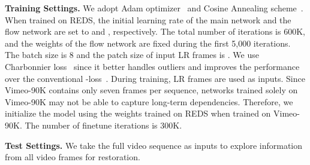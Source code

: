 \documentclass[10pt,twocolumn,letterpaper]{article}
\begin{document}
\noindent\textbf{Training Settings.}
We adopt Adam optimizer~\cite{kingma2014adam} and Cosine Annealing scheme~\cite{loshchilov2016sgdr}. When trained on REDS, the initial learning rate of the main network and the flow network are set to  and , respectively. The total number of iterations is 600K, and the weights of the flow network are fixed during the first 5,000 iterations. The batch size is 8 and the patch size of input LR frames is . We use Charbonnier loss~\cite{charbonnier1994two} since it better handles outliers and improves the performance over the conventional -loss~\cite{lai2017deep}. During training,  LR frames are used as inputs.
Since Vimeo-90K contains only seven frames per sequence, networks trained solely on Vimeo-90K may not be able to capture long-term dependencies. Therefore, we initialize the model using the weights trained on REDS when trained on Vimeo-90K. The number of finetune iterations is 300K.

\noindent\textbf{Test Settings.}
We take the full video sequence as inputs to explore information from all video frames for restoration.

\begin{table}[!t]
    \caption{\textbf{Architectures of  and }. The two modules share the first six layers. They can be implemented as a stack of convolutions followed by a channel-splitting. The arguments in the convolution layer are \textit{input channels}, \textit{output channels}, and \textit{kernel size}, respectively.}
    \label{tab:offset}
    \vspace{-1cm}
    \begin{center}
        \tabcolsep=0.15cm
        \vspace{0.5cm}
        \vspace{-0.4cm}
    \end{center}
\end{table}
\end{document}
